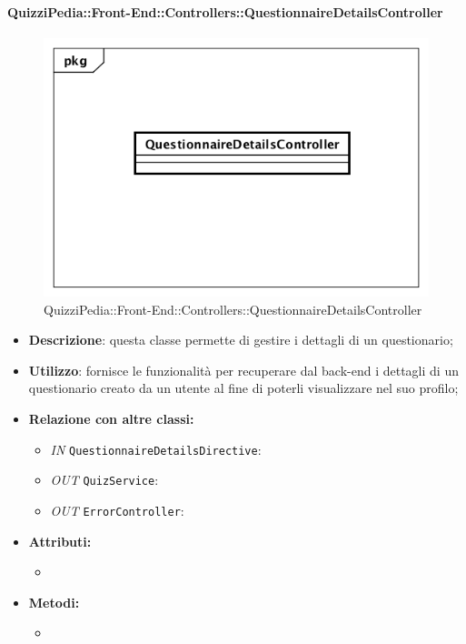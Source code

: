 \paragraph{QuizziPedia::Front-End::Controllers::QuestionnaireDetailsController}
\begin{figure}
	\centering
	\includegraphics[scale=0.45]{UML/Classi/Front-End/QuizziPedia_Front-end_Controller_QuestionnaireDetailsController.png}
	\caption{QuizziPedia::Front-End::Controllers::QuestionnaireDetailsController}
\end{figure}
\begin{itemize}
	\item \textbf{Descrizione}: questa classe permette di gestire i dettagli di un questionario; 
	\item \textbf{Utilizzo}: fornisce le funzionalità per recuperare dal back-end i dettagli di un questionario creato da un utente al fine di poterli visualizzare nel suo profilo;
	\item \textbf{Relazione con altre classi:}
	\begin{itemize}
		\item \textit{IN} \texttt{QuestionnaireDetailsDirective}:
		\item \textit{OUT} \texttt{QuizService}: 
		\item \textit{OUT} \texttt{ErrorController}: 
	\end{itemize}
	\item \textbf{Attributi:}
	\begin{itemize}
		\item 
	\end{itemize}
	\item \textbf{Metodi:}
	\begin{itemize}
		\item 
	\end{itemize}
\end{itemize}

